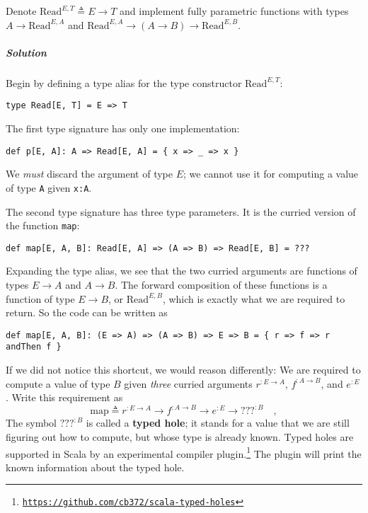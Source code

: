 Denote $\text{Read}^{E,T}\triangleq E\rightarrow T$ and implement
fully parametric functions with types $A\rightarrow\text{Read}^{E,A}$
and $\text{Read}^{E,A}\rightarrow(A\rightarrow B)\rightarrow\text{Read}^{E,B}$.

\subparagraph{Solution}

Begin by defining a type alias for the type constructor $\text{Read}^{E,T}$:
\begin{lstlisting}
type Read[E, T] = E => T
\end{lstlisting}
The first type signature has only one implementation:
\begin{lstlisting}
def p[E, A]: A => Read[E, A] = { x => _ => x }
\end{lstlisting}
We \emph{must} discard the argument of type $E$; we cannot use it
for computing a value of type \lstinline!A! given \lstinline!x:A!.

The second type signature has three type parameters. It is the curried
version of the function \lstinline!map!:
\begin{lstlisting}
def map[E, A, B]: Read[E, A] => (A => B) => Read[E, B] = ???
\end{lstlisting}
Expanding the type alias, we see that the two curried arguments are
functions of types $E\rightarrow A$ and $A\rightarrow B$. The forward
composition of these functions is a function of type $E\rightarrow B$,
or $\text{Read}^{E,B}$, which is exactly what we are required to
return. So the code can be written as

\begin{lstlisting}
def map[E, A, B]: (E => A) => (A => B) => E => B = { r => f => r andThen f }
\end{lstlisting}
If we did not notice this shortcut, we would reason differently: We
are required to compute a value of type $B$ given \emph{three} curried
arguments $r^{:E\rightarrow A}$, $f^{:A\rightarrow B}$, and $e^{:E}$.
Write this requirement as
\[
\text{map}\triangleq r^{:E\rightarrow A}\rightarrow f^{:A\rightarrow B}\rightarrow e^{:E}\rightarrow???^{:B}\quad,
\]
The symbol $\text{???}^{:B}$ is called a \textbf{typed
hole}; it stands for a value that we are still figuring out how to
compute, but whose type is already known. Typed holes are supported
in Scala by an experimental compiler plugin.\footnote{\texttt{\href{https://github.com/cb372/scala-typed-holes}{https://github.com/cb372/scala-typed-holes}}}
The plugin will print the known information about the typed hole.


